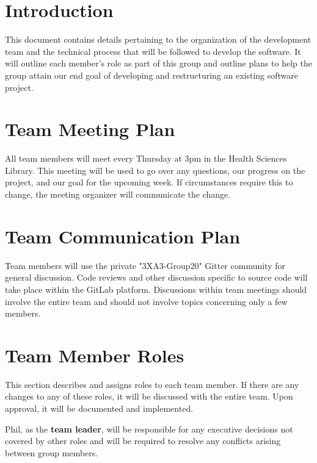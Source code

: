 \documentclass[12pt]{article}
\begin{document}
\begin{flushleft}
\setlength{\parindent}{3ex}

\tableofcontents
\newpage

\section{Introduction}
This document contains details pertaining to the organization of the development team and the technical process that will be followed to develop the software. It will outline each member's role as part of this group and outline plans to help the group attain our end goal of developing and restructuring an existing software project.

\section{Team Meeting Plan}

All team members will meet every Thursday at 3pm in the Health Sciences Library. This meeting will be used to go over any questions, our progress on the project, and our goal for the upcoming week. If circumstances require this to change, the meeting organizer will communicate the change.

\section{Team Communication Plan}

Team members will use the private "3XA3-Group20" Gitter community for general discussion. Code reviews and other discussion specific to source code will take place within the GitLab platform. Discussions within team meetings should involve the entire team and should not involve topics concerning only a few members. 

\section{Team Member Roles}
This section describes and assigns roles to each team member. If there are any changes to any of these roles, it will be discussed with the entire team. Upon approval, it will be documented and implemented. \newline

Phil, as the \textbf{team leader}, will be responsible for any executive decisions not covered by other roles and will be required to resolve any conflicts arising between group members. \newline


\end{flushleft}
\end{document}

